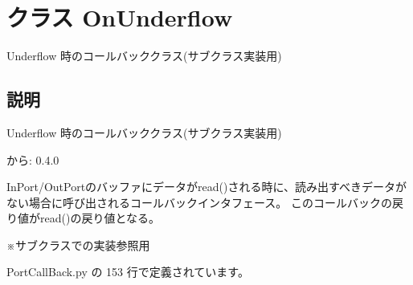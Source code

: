 \section{クラス OnUnderflow}
\label{classsource__py_1_1_port_call_back_1_1_on_underflow}
Underflow 時のコールバッククラス(サブクラス実装用)  




\subsection{説明}
Underflow 時のコールバッククラス(サブクラス実装用) 

\begin{Desc}
\item[から:]0.4.0\end{Desc}
InPort/OutPortのバッファにデータがread()される時に、読み出すべきデータが ない場合に呼び出されるコールバックインタフェース。 このコールバックの戻り値がread()の戻り値となる。\par
 ※サブクラスでの実装参照用 

 PortCallBack.py の 153 行で定義されています。